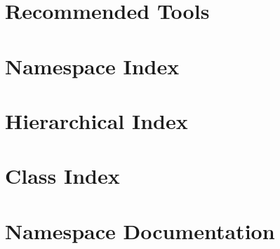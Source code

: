 \documentclass[twoside]{book}
\newcommand{\+}{\discretionary{\mbox{\scriptsize$\hookleftarrow$}}{}{}}
\begin{document}
\chapter{Recommended Tools}
\label{md_docs__s_u_p_p_l_e_m_e_n_t__r_e_a_d_m_e}

\chapter{Namespace Index}

\chapter{Hierarchical Index}

\chapter{Class Index}

\chapter{Namespace Documentation}



\end{document}
